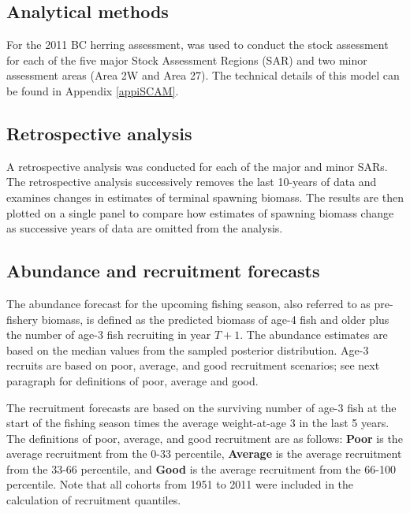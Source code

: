 	\subsection{Analytical methods}

	For the 2011 BC herring assessment, \iscam was used to conduct the stock assessment for each of the five major Stock Assessment Regions (SAR) and two minor assessment areas (Area 2W and Area 27).  The technical details of this model can be found in Appendix \ref{appiSCAM}.
		
	\subsection{Retrospective analysis}
	A retrospective analysis was conducted for each of the major and minor SARs.  The retrospective analysis successively removes the last 10-years of data and examines changes in estimates of terminal spawning biomass.  The results are then plotted on a single panel to compare how estimates of spawning biomass change as successive years of data are omitted from the analysis.
	
	\subsection{Abundance and recruitment forecasts}
	The abundance forecast for the upcoming fishing season, also referred to as pre-fishery biomass, is defined as the predicted biomass of age-4 fish and older plus the number of age-3 fish recruiting in year $T+1$.  The abundance estimates are based on the median values from the sampled posterior distribution.  Age-3 recruits are based on poor, average, and good recruitment scenarios; see next paragraph for definitions of poor, average and good.
	
	The recruitment forecasts are based on the surviving number of age-3 fish at the start of the fishing season times the average weight-at-age 3 in the last 5 years. The definitions of poor, average, and good recruitment are as follows: \textbf{Poor} is the average recruitment from the 0-33 percentile, \textbf{Average} is the average recruitment from the 33-66 percentile, and \textbf{Good} is the average recruitment from the 66-100 percentile.  Note that all cohorts from 1951 to 2011  were included in the calculation of recruitment quantiles.
	
